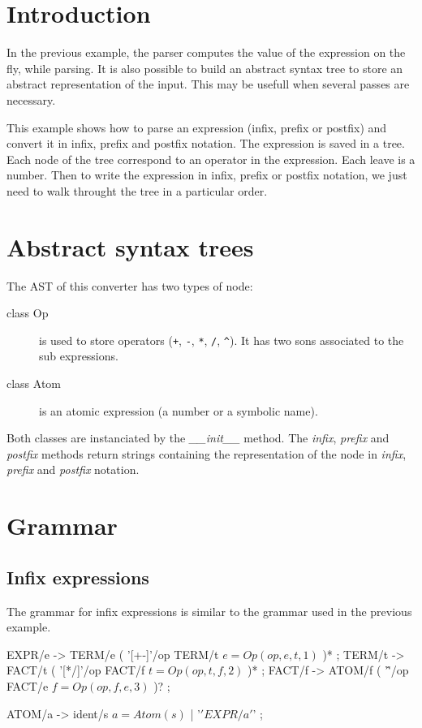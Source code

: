 \section{Introduction}

In the previous example, the parser computes the value of the expression on the fly, while parsing.
It is also possible to build an abstract syntax tree to store an abstract representation of the input.
This may be usefull when several passes are necessary.

This example shows how to parse an expression (infix, prefix or postfix) and convert it in infix, prefix and postfix notation.
The expression is saved in a tree. Each node of the tree correspond to an operator in the expression. Each leave is a number.
Then to write the expression in infix, prefix or postfix notation, we just need to walk throught the tree in a particular order.

\section{Abstract syntax trees}

The AST of this converter has two types of node:

\begin{description}
	\item [class Op] is used to store operators (\verb$+$, \verb$-$, \verb$*$, \verb$/$, \verb$^$).
		It has two sons associated to the sub expressions.
	\item [class Atom] is an atomic expression (a number or a symbolic name).
\end{description}

Both classes are instanciated by the \emph{\_\_init\_\_} method. The \emph{infix}, \emph{prefix} and \emph{postfix} methods return strings containing the representation of the node in \emph{infix}, \emph{prefix} and \emph{postfix} notation.

\section{Grammar}

\subsection{Infix expressions}

The grammar for infix expressions is similar to the grammar used in the previous example.

\begin{verbatimtab}[4]
EXPR/e -> TERM/e ( '[+-]'/op TERM/t $e=Op(op,e,t,1)$ )* ;
TERM/t -> FACT/t ( '[*/]'/op FACT/f $t=Op(op,t,f,2)$ )* ;
FACT/f -> ATOM/f ( '\^'/op FACT/e $f=Op(op,f,e,3)$ )? ;

ATOM/a -> ident/s $a=Atom(s)$ | '\(' EXPR/a '\)' ;
\end{verbatimtab}

